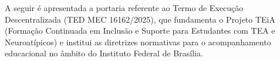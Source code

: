 \documentclass[%
    	        oneside,                   %
]{configuracoes/norma-abntex2}
\begin{document}
\begin{apendicesenv}
A seguir é apresentada a portaria referente ao Termo de Execução Descentralizada (TED MEC 16162/2025), que fundamenta o Projeto TEiA (Formação Continuada em Inclusão e Suporte para Estudantes com TEA e Neuroatípicos) e institui as diretrizes normativas para o acompanhamento educacional no âmbito do Instituto Federal de Brasília.



\end{apendicesenv}
\end{document}
